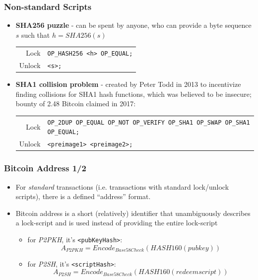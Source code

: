 \documentclass{beamer}
\begin{document}
\begin{frame}[fragile]
  \frametitle{Non-standard Scripts}
  \begin{itemize}
  \item \textbf{SHA256 puzzle} - can be spent by anyone, who can provide a byte
    sequence $s$ such that $h = SHA256(s)$
    \break
    \begin{tabular}{rl}
      Lock &\tiny\texttt{OP_HASH256 <h> OP_EQUAL;} \\
      Unlock &\tiny\texttt{<s>;} \\
    \end{tabular}
  \item \textbf{SHA1 collision problem} - created by Peter Todd in 2013 to
    incentivize finding collisions for SHA1 hash functions, which was believed
    to be insecure; bounty of 2.48 Bitcoin claimed in 2017:
    \break
    \begin{tabular}{rl}
      Lock &\tiny\texttt{OP_2DUP OP_EQUAL OP_NOT OP_VERIFY OP_SHA1 OP_SWAP OP_SHA1 OP_EQUAL;} \\
      Unlock &\tiny\texttt{<preimage1> <preimage2>;} \\
    \end{tabular}
  \end{itemize}
\end{frame}

\begin{frame}[fragile]
  \frametitle{Bitcoin Address 1/2}
  \begin{itemize}
  \item For \textit{standard} transactions (i.e. transactions with standard
    lock/unlock scripts), there is a defined ``address'' format.    
  \item Bitcoin address is a short (relatively) identifier that unambiguously
    describes a lock-script and is used instead of providing the entire
    lock-script
    \begin{itemize}
    \item for \textit{P2PKH}, it's \texttt{<pubKeyHash>}:
      $$A_{P2PKH} = Encode_{Base58Check}(HASH160(pubkey))$$
    \item for \textit{P2SH}, it's \texttt{<scriptHash>}:
      $$A_{P2SH} = Encode_{Base58Check}(HASH160(redeemscript))$$
    \end{itemize}
  \end{itemize}
\end{frame}
\end{document}
